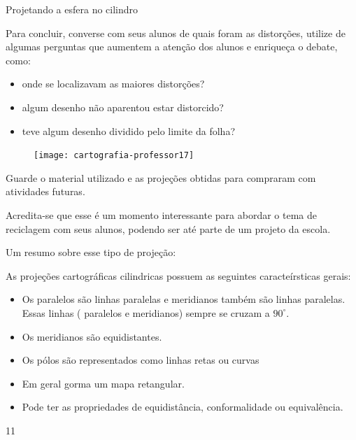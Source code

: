\begin{Recomenda}{Projetando a esfera no cilindro}
{
  Para concluir, converse com seus alunos de quais foram as distorções, utilize de algumas perguntas que aumentem a atenção dos alunos e enriqueça o debate, como:
  \begin{itemize}
  \item onde se localizavam as maiores distorções?
  \item algum desenho não aparentou estar distorcido?
  \item teve algum desenho dividido pelo limite da folha?
  \end{itemize}

  \begin{figure}[H]
  \centering
  
  \texttt{[image: cartografia-professor17]}
  \end{figure}

  Guarde o material utilizado e as projeções obtidas para compraram com atividades futuras.

  Acredita-se que esse é um momento interessante para abordar o tema de reciclagem com seus alunos, podendo ser até parte de um projeto da escola.

  Um resumo sobre esse tipo de projeção:

  As projeções cartográficas cilindricas possuem as seguintes caracteírsticas gerais:
  \begin{itemize}
  \item Os paralelos são linhas paralelas e meridianos também são linhas paralelas. Essas linhas ( paralelos e meridianos) sempre se cruzam a $90^{\circ}$.
  \item Os meridianos são equidistantes.
  \item Os pólos são representados como linhas retas ou curvas 
  \item Em geral gorma um mapa retangular.
  \item Pode ter as propriedades de equidistância, conformalidade ou equivalência.
  \end{itemize}
  }{1}{1}
\end{Recomenda}

\label{Pcilindricas}

